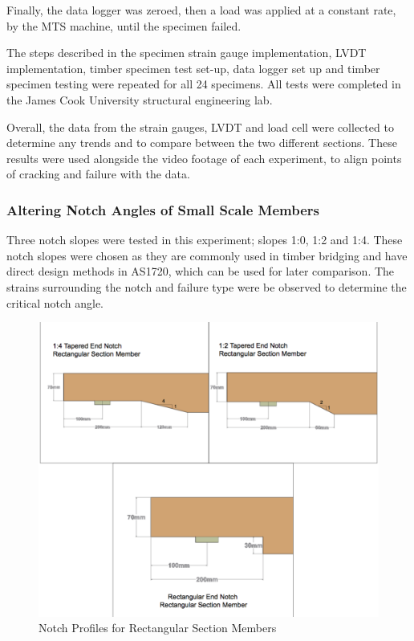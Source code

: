 \documentclass[11pt,a4paper]{article}
\numberwithin{equation}{subsection}
\begin{document}
\noindent
Finally, the data logger was zeroed, then a load was applied at a constant rate, by the MTS machine, until the specimen failed. 

\vspace*{\baselineskip}
\noindent
The steps described in the specimen strain gauge implementation, LVDT implementation, timber specimen test set-up, data logger set up and timber specimen testing were repeated for all 24 specimens. All tests were completed in the James Cook University structural engineering lab. 

\vspace*{\baselineskip}
\noindent
Overall, the data from the strain gauges, LVDT and load cell were collected to determine any trends and to compare between the two different sections. These results were used alongside the video footage of each experiment, to align points of cracking and failure with the data. 
\pagebreak

\subsubsection{Altering Notch Angles of Small Scale Members}
Three notch slopes were tested in this experiment; slopes 1:0, 1:2 and 1:4. These notch slopes were chosen as they are commonly used in timber bridging and have direct design methods in AS1720, which can be used for later comparison. The strains surrounding the notch and failure type were be observed to determine the critical notch angle. 

\begin{figure}[h]
	\begin{center}
		\includegraphics[scale=0.4]{Notch_Angles}
	\end{center}
	\caption{Notch Profiles for Rectangular Section Members}
	\label{fig:Rectangular2}
\end{figure}
\pagebreak
\end{document}
